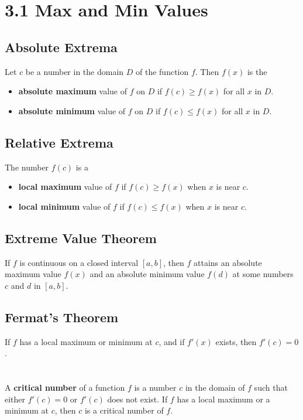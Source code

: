 %
%

\section*{3.1 Max and Min Values}

\subsection*{Absolute Extrema}

Let \(c\) be a number in the domain \(D\) of the function \(f\). Then \(f(x)\) is the 
\begin{itemize}
    \item \textbf{absolute maximum} value of \(f\) on \(D\) if \(f(c) \geq f(x)\) for all \(x\) in \(D\).
    \item \textbf{absolute minimum} value of \(f\) on \(D\) if \(f(c) \leq f(x)\) for all \(x\) in \(D\).
\end{itemize}

\subsection*{Relative Extrema}

The number \(f(c)\) is a 
\begin{itemize}
    \item \textbf{local maximum} value of \(f\) if \(f(c) \geq f(x)\) when \(x\) is near \(c\).
    \item \textbf{local minimum} value of \(f\) if \(f(c) \leq f(x)\) when \(x\) is near \(c\).
\end{itemize}

\subsection*{Extreme Value Theorem}

If \(f\) is continuous on a closed interval \([a, b]\), then \(f\) attains an absolute maximum value \(f(x)\) and an absolute minimum value \(f(d)\) at some numbers \(c\) and \(d\) in \([a, b]\).

\subsection*{Fermat's Theorem}

If \(f\) has a local maximum or minimum at \(c\), and if \(f'(x)\) exists, then \(f'(c)=0\).
\\\\\\
A \textbf{critical number} of a function \(f\) is a number \(c\) in the domain of \(f\) such that either \(f'(c)=0\) or \(f'(c)\) does not exist. If \(f\) has a local maximum or a minimum at \(c\), then \(c\) is a critical number of \(f\).

